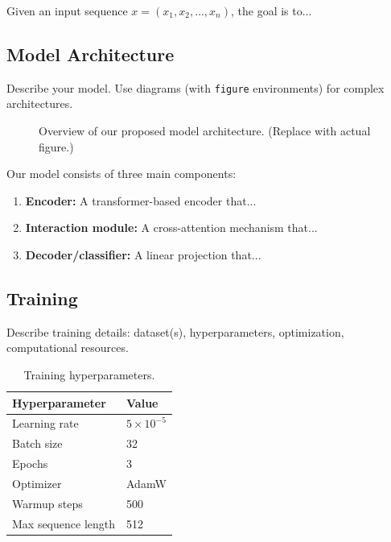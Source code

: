 \documentclass[11pt,a4paper]{article}
\begin{document}
Given an input sequence $x = (x_1, x_2, \ldots, x_n)$, the goal is to...

\subsection{Model Architecture}

Describe your model. Use diagrams (with \texttt{figure} environments) for 
complex architectures.

\begin{figure}[t]
  \centering
  \caption{Overview of our proposed model architecture. 
    (Replace with actual figure.)}
  \label{fig:architecture}
\end{figure}

Our model consists of three main components:
\begin{enumerate}
  \item \textbf{Encoder:} A transformer-based encoder that...
  \item \textbf{Interaction module:} A cross-attention mechanism that...
  \item \textbf{Decoder/classifier:} A linear projection that...
\end{enumerate}

\subsection{Training}

Describe training details: dataset(s), hyperparameters, optimization, 
computational resources.

\begin{table}[t]
  \centering
  \begin{tabular}{@{}ll@{}}
    \toprule
    \textbf{Hyperparameter} & \textbf{Value} \\
    \midrule
    Learning rate & $5 \times 10^{-5}$ \\
    Batch size & 32 \\
    Epochs & 3 \\
    Optimizer & AdamW \\
    Warmup steps & 500 \\
    Max sequence length & 512 \\
    \bottomrule
  \end{tabular}
  \caption{Training hyperparameters.}
  \label{tab:hyperparams}
\end{table}
\end{document}
